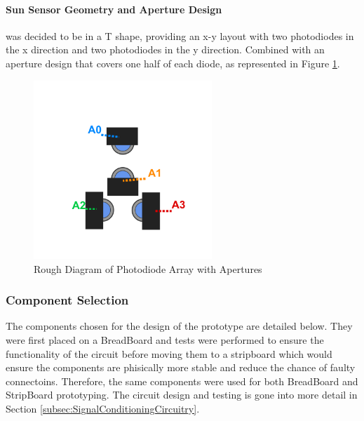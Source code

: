 \paragraph{Sun Sensor Geometry and Aperture Design} was decided to be in a T shape, providing an x-y layout with two photodiodes in the x direction and two photodiodes in the y direction. Combined with an aperture design that covers one half of each diode, as represented in Figure \ref{fig:diodeApertureDiagram}.

%
\begin{figure}[htbp] %
    \centering
    \includegraphics[width=0.6\textwidth]{chapters/methodology/prototype/diodeApertureDiagram.png}
    \caption{Rough Diagram of Photodiode Array with Apertures}
    \label{fig:diodeApertureDiagram}
\end{figure}


\subsubsection*{Component Selection}
The components chosen for the design of the prototype are detailed below. They were first placed on a BreadBoard and tests were performed to ensure the functionality of the circuit before moving them to a stripboard which would ensure the components are phisically more stable and reduce the chance of faulty connectoins. Therefore, the same components were used for both BreadBoard and StripBoard prototyping. The circuit design and testing is gone into more detail in Section \ref{subsec:SignalConditioningCircuitry}. 

